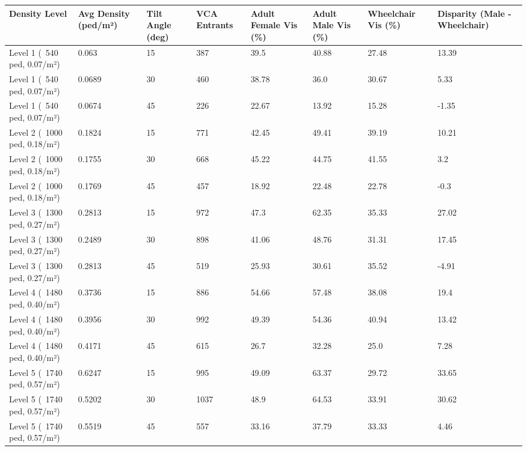 \begin{tabular}{llllllll}
\hline
Density Level & Avg Density (ped/m²) & Tilt Angle (deg) & VCA Entrants & Adult Female Vis (\%) & Adult Male Vis (\%) & Wheelchair Vis (\%) & Disparity (Male - Wheelchair) \\ \hline
Level 1 (~540 ped, 0.07/m²) & 0.063 & 15 & 387 & 39.5 & 40.88 & 27.48 & 13.39 \\
Level 1 (~540 ped, 0.07/m²) & 0.0689 & 30 & 460 & 38.78 & 36.0 & 30.67 & 5.33 \\
Level 1 (~540 ped, 0.07/m²) & 0.0674 & 45 & 226 & 22.67 & 13.92 & 15.28 & -1.35 \\
Level 2 (~1000 ped, 0.18/m²) & 0.1824 & 15 & 771 & 42.45 & 49.41 & 39.19 & 10.21 \\
Level 2 (~1000 ped, 0.18/m²) & 0.1755 & 30 & 668 & 45.22 & 44.75 & 41.55 & 3.2 \\
Level 2 (~1000 ped, 0.18/m²) & 0.1769 & 45 & 457 & 18.92 & 22.48 & 22.78 & -0.3 \\
Level 3 (~1300 ped, 0.27/m²) & 0.2813 & 15 & 972 & 47.3 & 62.35 & 35.33 & 27.02 \\
Level 3 (~1300 ped, 0.27/m²) & 0.2489 & 30 & 898 & 41.06 & 48.76 & 31.31 & 17.45 \\
Level 3 (~1300 ped, 0.27/m²) & 0.2813 & 45 & 519 & 25.93 & 30.61 & 35.52 & -4.91 \\
Level 4 (~1480 ped, 0.40/m²) & 0.3736 & 15 & 886 & 54.66 & 57.48 & 38.08 & 19.4 \\
Level 4 (~1480 ped, 0.40/m²) & 0.3956 & 30 & 992 & 49.39 & 54.36 & 40.94 & 13.42 \\
Level 4 (~1480 ped, 0.40/m²) & 0.4171 & 45 & 615 & 26.7 & 32.28 & 25.0 & 7.28 \\
Level 5 (~1740 ped, 0.57/m²) & 0.6247 & 15 & 995 & 49.09 & 63.37 & 29.72 & 33.65 \\
Level 5 (~1740 ped, 0.57/m²) & 0.5202 & 30 & 1037 & 48.9 & 64.53 & 33.91 & 30.62 \\
Level 5 (~1740 ped, 0.57/m²) & 0.5519 & 45 & 557 & 33.16 & 37.79 & 33.33 & 4.46 \\
\hline
\end{tabular}
